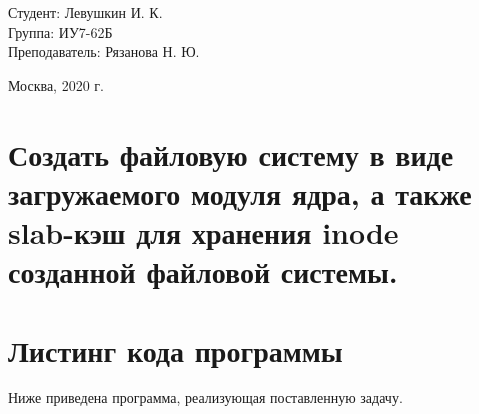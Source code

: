 \documentclass[a4paper,12pt]{article}
\begin{document}
	\large
	\begin{flushright}
		Студент: Левушкин И. К. \\
		Группа: ИУ7-62Б \\
		Преподаватель: Рязанова Н. Ю. \\
	\end{flushright}
	
	\vspace*{30mm}
	\begin{center}
		Москва, 2020 г.  
	\end{center}
	\thispagestyle{empty}
	
	\newpage
	
	\section*{Создать файловую систему в виде загружаемого модуля ядра, а также slab-кэш для хранения inode созданной файловой системы.}
	
	\section*{Листинг кода программы}
	
	Ниже приведена программа, реализующая поставленную задачу.
	
\end{document}
